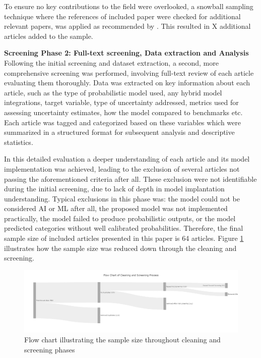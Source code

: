To ensure no key contributions to the field were overlooked, a snowball sampling technique where the references of included paper were checked for additional relevant papers, was applied as recommended by \textcite{marzi_et_al_2024}. This resulted in X additional articles added to the sample. 


\textbf{Screening Phase 2: Full-text screening, Data extraction and Analysis} \\
Following the initial screening and dataset extraction, a second, more comprehensive screening was performed, involving full-text review of each article evaluating them thoroughly. Data was extracted on key information about each article, such as the type of probabilistic model used, any hybrid model integrations, target variable, type of uncertainty addressed, metrics used for assessing uncertainty estimates, how the model compared to benchmarks etc. Each article was tagged and categorized based on these variables which were summarized in a structured format for subsequent analysis and descriptive statistics. 

In this detailed evaluation a deeper understanding of each article and its model implementation was achieved, leading to the exclusion of several articles not passing the aforementioned criteria after all. These exclusion were not identifiable during the initial screening, due to lack of depth in model implantation understanding. Typical exclusions in this phase was: the model could not be considered AI or ML after all, the proposed model was not implemented practically, the model failed to produce probabilistic outputs, or the model predicted categories without well calibrated probabilities. Therefore, the final sample size of included articles presented in this paper is 64 articles. Figure \ref{fig:screening_and_cleaning_funnel} illustrates how the sample size was reduced down through the cleaning and screening. 

  \begin{figure}[H]
      \centering
      \includegraphics[width=1\linewidth]{Images/screening_funnel.png}
      \caption{Flow chart illustrating the sample size throughout cleaning and screening phases}
      \label{fig:screening_and_cleaning_funnel}
  \end{figure}


